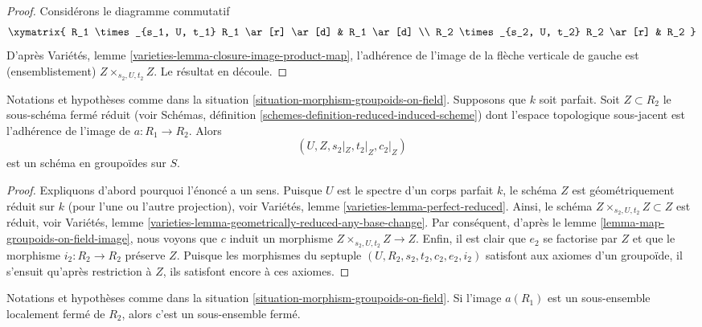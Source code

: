 \begin{proof}
Considérons le diagramme commutatif
$$
\xymatrix{
R_1 \times_{s_1, U, t_1} R_1 \ar[r] \ar[d] & R_1 \ar[d] \\
R_2 \times_{s_2, U, t_2} R_2 \ar[r] & R_2
}
$$
D'après
Variétés, lemme \ref{varieties-lemma-closure-image-product-map},
l'adhérence de l'image de la flèche verticale de gauche est (ensemblistement)
$Z \times_{s_2, U, t_2} Z$.
Le résultat en découle.
\end{proof}

\begin{lemma}
\label{lemma-map-groupoids-on-perfect-field-image}
Notations et hypothèses comme dans la
situation \ref{situation-morphism-groupoids-on-field}.
Supposons que $k$ soit parfait.
Soit $Z \subset R_2$ le sous-schéma fermé réduit (voir
Schémas, définition \ref{schemes-definition-reduced-induced-scheme})
dont l'espace topologique sous-jacent est l'adhérence de l'image de
$a : R_1 \to R_2$. Alors
$$
(U, Z, s_2|_Z, t_2|_Z, c_2|_Z)
$$
est un schéma en groupoïdes sur $S$.
\end{lemma}

\begin{proof}
Expliquons d'abord pourquoi l'énoncé a un sens. Puisque $U$ est le spectre
d'un corps parfait $k$, le schéma $Z$ est géométriquement réduit
sur $k$ (pour l'une ou l'autre projection), voir
Variétés, lemme \ref{varieties-lemma-perfect-reduced}.
Ainsi, le schéma $Z \times_{s_2, U, t_2} Z \subset Z$
est réduit, voir
Variétés, lemme \ref{varieties-lemma-geometrically-reduced-any-base-change}.
Par conséquent, d'après le
lemme \ref{lemma-map-groupoids-on-field-image},
nous voyons que $c$ induit un morphisme
$Z \times_{s_2, U, t_2} Z \to Z$.
Enfin, il est clair que $e_2$ se factorise par $Z$
et que le morphisme $i_2 : R_2 \to R_2$ préserve $Z$. Puisque les morphismes
du septuple
$(U, R_2, s_2, t_2, c_2, e_2, i_2)$
satisfont aux axiomes d'un groupoïde, il s'ensuit qu'après restriction
à $Z$, ils satisfont encore à ces axiomes.
\end{proof}

\begin{lemma}
\label{lemma-locally-closed-image-is-closed}
Notations et hypothèses comme dans la
situation \ref{situation-morphism-groupoids-on-field}.
Si l'image $a(R_1)$ est un sous-ensemble localement fermé de $R_2$,
alors c'est un sous-ensemble fermé.
\end{lemma}

